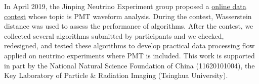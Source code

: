 \acknowledgments
In April 2019, the Jinping Neutrino Experiment group proposed a \href{https://mp.weixin.qq.com/s?__biz=MzA4MTAwMzgzOA==&mid=2650872289&idx=2&sn=48145a6598545d201f940e0459de99dd&chksm=846e2db0b319a4a627e902d0d6ed4b9d968225566021342c5935764963f352fbe02db1bdb333&mpshare=1&scene=1&srcid=0307c4HOvK0ChJUcq9blC3ub%23rd}{online data contest} whose topic is PMT waveform analysis. During the contest, Wasserstein distance was used to assess the performance of algorithms. After the contest, we collected several algorithms submitted by participants and we checked, redesigned, and tested these algorithms to develop practical data processing flow applied on neutrino experiments where PMT is included. This work is supported in part by the National Natural Science Foundation of China (11620101004), the Key Laboratory of Particle \& Radiation Imaging (Tsinghua University). 


